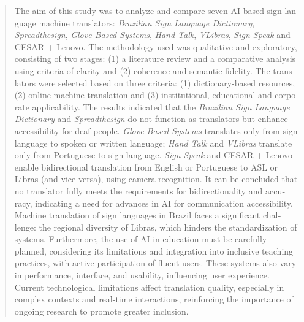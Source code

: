 \documentclass[portuguese]{textolivre}
\begin{document}
\begin{polyabstract}
\begin{english}
\begin{abstract}
The aim of this study was to analyze and compare seven AI-based sign language machine translators: \textit{Brazilian Sign Language Dictionary}, \textit{Spreadthesign}, \textit{Glove-Based Systems}, \textit{Hand Talk}, \textit{VLibras}, \textit{Sign-Speak} and CESAR + Lenovo. The methodology used was qualitative and exploratory, consisting of two stages: (1) a literature review and a comparative analysis using criteria of clarity and (2) coherence and semantic fidelity. The translators were selected based on three criteria: (1) dictionary-based resources, (2) online machine translation and (3) institutional, educational and corporate applicability. The results indicated that the \textit{Brazilian Sign Language Dictionary} and \textit{Spreadthesign} do not function as translators but enhance accessibility for deaf people. \textit{Glove-Based Systems} translates only from sign language to spoken or written language; \textit{Hand Talk} and \textit{VLibras} translate only from Portuguese to sign language. \textit{Sign-Speak} and CESAR + Lenovo enable bidirectional translation from English or Portuguese to ASL or Libras (and vice versa), using camera recognition. It can be concluded that no translator fully meets the requirements for bidirectionality and accuracy, indicating a need for advances in AI for communication accessibility. Machine translation of sign languages in Brazil faces a significant challenge: the regional diversity of Libras, which hinders the standardization of systems. Furthermore, the use of AI in education must be carefully planned, considering its limitations and integration into inclusive teaching practices, with active participation of fluent users. These systems also vary in performance, interface, and usability, influencing user experience. Current technological limitations affect translation quality, especially in complex contexts and real-time interactions, reinforcing the importance of ongoing research to promote greater inclusion.

\end{abstract}
\end{english}
\end{polyabstract}
\end{document}
